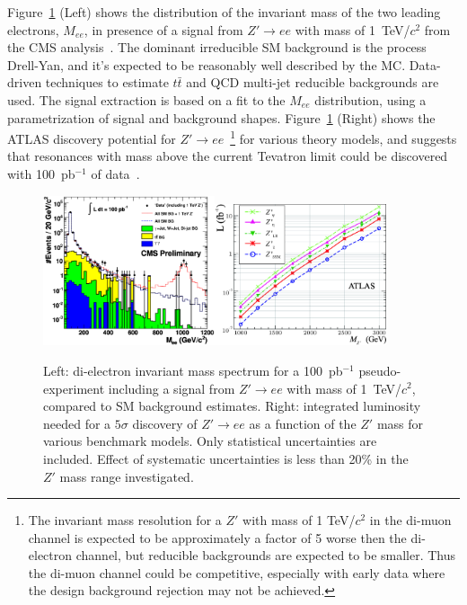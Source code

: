 \documentclass{cmspaper}
\begin{document}
Figure~\ref{fig:MeeAndZPrimeDisc} (Left) shows the distribution of 
the invariant mass of the two leading electrons, $M_{ee}$, in presence of 
a signal from $Z' \rightarrow ee$ with mass of 1~TeV/$c^2$
from the CMS analysis~\cite{HEEPNOTE}. The dominant irreducible SM background 
is the process Drell-Yan, and it's expected to be 
reasonably well described by the MC. Data-driven techniques to estimate $t\bar{t}$ and QCD multi-jet
reducible backgrounds are used. The signal extraction is based on a fit 
to the $M_{ee}$ distribution, using a parametrization of signal and 
background shapes. Figure~\ref{fig:MeeAndZPrimeDisc} (Right)
shows the ATLAS discovery potential for 
$Z' \rightarrow ee$~\footnote{The invariant mass resolution for a $Z'$ 
with mass of 1 TeV/$c^2$ in the di-muon channel is expected to be approximately 
a factor of 5 worse then the di-electron channel, 
but reducible backgrounds are expected to be smaller. 
Thus the di-muon channel could be competitive, 
especially with early data where the design background rejection may not be 
achieved.} for various theory 
models, and suggests that resonances with mass 
above the current Tevatron limit could be discovered with 
100~pb$^{-1}$ of data~\cite{DiLepResonancesATLAS}. 

\begin{figure}[htbp] 
\centering
\includegraphics[width=0.45\textwidth]{st_mass_all_withZPrime_ALLTOPO.eps}\includegraphics[width=0.45\textwidth]{fig9L.eps}
\caption{Left: di-electron invariant mass spectrum for a 
100~pb$^{-1}$ pseudo-experiment including a signal from 
$Z' \rightarrow ee$ with mass of 1~TeV/$c^2$, 
compared to SM background estimates. Right: integrated 
luminosity needed for a $5\sigma$ discovery of $Z' \rightarrow ee$
as a function of the $Z'$ mass for various benchmark models. Only 
statistical uncertainties are included. 
Effect of systematic uncertainties is less than 20\% in the $Z'$ mass
range investigated.}
\label{fig:MeeAndZPrimeDisc}
\end{figure}
\end{document}
